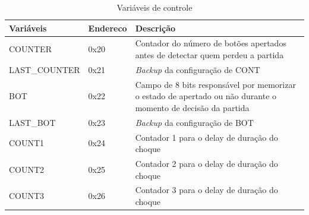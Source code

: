 \documentclass[article]{IEEEtran}
\begin{document}
\begin{table}
  \centering
  \caption{Variáveis de controle}
  \vspace{0.5cm}
  \label{tab:variaveis}
  \begin{tabular}{|p{3cm}|p{1.4cm}|p{6.6cm}|} \hline
    Variáveis 		& Endereco & Descrição 						\\ \hline
    COUNTER		& 0x20	   & Contador do número de botões apertados antes
				     de detectar quem perdeu a partida			\\ \hline
    LAST\_COUNTER	& 0x21	   & \textit{Backup} da configuração de CONT		\\ \hline
    BOT			& 0x22	   & Campo de 8 bits responsável por memorizar
				     o estado de apertado ou não durante o 
				     momento de decisão da partida			\\ \hline
    LAST\_BOT		& 0x23	   & \textit{Backup} da configuração de BOT 		\\ \hline  
    COUNT1		& 0x24	   & Contador 1 para o delay de duração do choque	\\ \hline
    COUNT2		& 0x25	   & Contador 2 para o delay de duração do choque	\\ \hline
    COUNT3		& 0x26	   & Contador 3 para o delay de duração do choque	\\ \hline
  \end{tabular}
\end{table}
\end{document}
